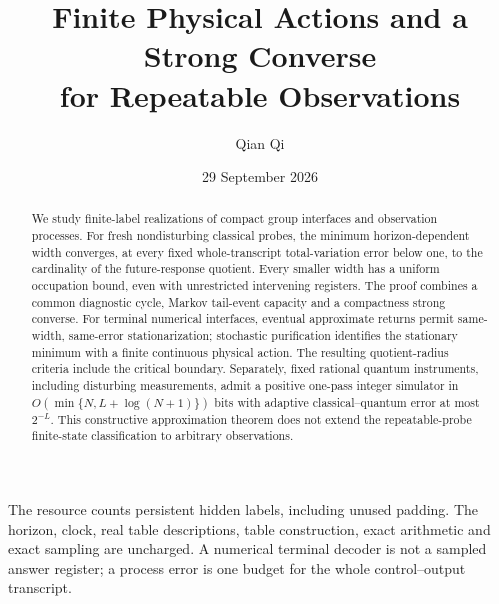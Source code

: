 \documentclass[11pt]{amsart}
\title[Finite actions and a process strong converse]{Finite Physical Actions and a Strong Converse\\for Repeatable Observations}
\author{Qian Qi}
\date{29 September 2026}
\numberwithin{equation}{section}
\theoremstyle{definition}\newtheorem{definition}[theorem]{Definition}
\theoremstyle{remark}\newtheorem{remark}[theorem]{Remark}
\begin{document}
\begin{abstract}
We study finite-label realizations of compact group interfaces and
observation processes. For fresh nondisturbing classical probes, the
minimum horizon-dependent width converges, at every fixed
whole-transcript total-variation error below one, to the cardinality
of the future-response quotient. Every smaller width has a uniform
occupation bound, even with unrestricted intervening registers.
The proof combines a common diagnostic cycle, Markov tail-event
capacity and a compactness strong converse. For terminal numerical
interfaces, eventual approximate returns permit same-width,
same-error stationarization; stochastic purification identifies the
stationary minimum with a finite continuous physical action.
The resulting quotient-radius criteria include the critical boundary.
Separately, fixed rational quantum instruments, including disturbing
measurements, admit a positive one-pass integer simulator in
$O(\min\{N,L+\log(N+1)\})$ bits with adaptive
classical--quantum error at most $2^{-L}$.
This constructive approximation theorem does not extend the
repeatable-probe finite-state classification to arbitrary observations.
\end{abstract}
\maketitle
\noindent The resource counts persistent hidden labels, including unused
padding. The horizon, clock, real table descriptions, table construction,
exact arithmetic and exact sampling are uncharged. A numerical terminal
decoder is not a sampled answer register; a process error is one budget
for the whole control--output transcript.


















\end{document}
